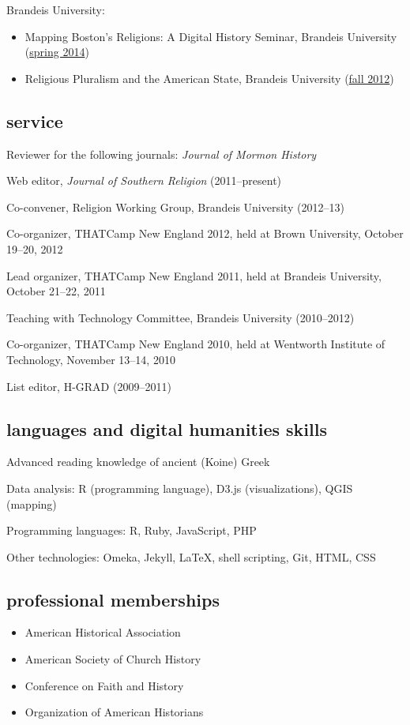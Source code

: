 \documentclass[11pt]{article}
\providecommand{\tightlist}{%
  \setlength{\itemsep}{0pt}\setlength{\parskip}{0pt}}
\begin{document}
Brandeis University:

\begin{itemize}
\tightlist
\item
  Mapping Boston's Religions: A Digital History Seminar, Brandeis
  University (\href{/downloads/pdf/religion-19c-dh.pdf}{spring 2014})
\item
  Religious Pluralism and the American State, Brandeis University
  (\href{/downloads/pdf/religious-pluralism.syllabus.2012-fall.pdf}{fall
  2012})
\end{itemize}

\subsection{service}\label{service}

Reviewer for the following journals: \emph{Journal of Mormon History}

Web editor, \emph{Journal of Southern Religion} (2011--present)

Co-convener, Religion Working Group, Brandeis University (2012--13)

Co-organizer, THATCamp New England 2012, held at Brown University,
October 19--20, 2012

Lead organizer, THATCamp New England 2011, held at Brandeis University,
October 21--22, 2011

Teaching with Technology Committee, Brandeis University (2010--2012)

Co-organizer, THATCamp New England 2010, held at Wentworth Institute of
Technology, November 13--14, 2010

List editor, H-GRAD (2009--2011)

\subsection{languages and digital humanities
skills}\label{languages-and-digital-humanities-skills}

Advanced reading knowledge of ancient (Koine) Greek

Data analysis: R (programming language), D3.js (visualizations), QGIS
(mapping)

Programming languages: R, Ruby, JavaScript, PHP

Other technologies: Omeka, Jekyll, \LaTeX, shell scripting, Git, HTML,
CSS

\subsection{professional memberships}\label{professional-memberships}

\begin{itemize}
\item
  American Historical Association
\item
  American Society of Church History
\item
  Conference on Faith and History
\item
  Organization of American Historians
\end{itemize}
\end{document}
